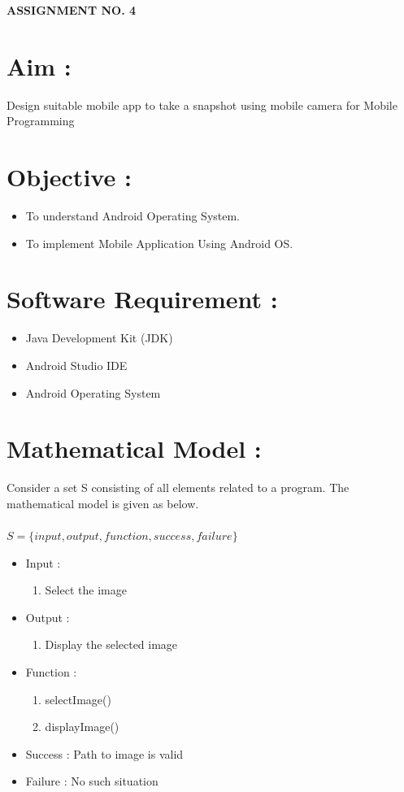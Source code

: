 \documentclass{article}
\begin{document}
\begin{center}
\textbf{\bfseries\Large ASSIGNMENT NO. 4}
\\[1cm]
\end{center}


\section{Aim : } 
	Design suitable mobile app to take a snapshot using mobile camera for Mobile Programming


\section{Objective : }  
	\begin{itemize}
		\item To understand Android Operating System.
		\item To implement Mobile Application Using Android OS.
	\end{itemize}

\section{Software Requirement : }  
	\begin{itemize}
    	\item Java Development Kit (JDK)
		\item Android Studio IDE
		\item Android Operating System
	\end{itemize}

\section{Mathematical Model : }  
	Consider a set S consisting of all elements related to a program. 
	The mathematical model is given as below.  \\  \\
    $S=\{input,output,function,success,failure\}$
	\begin{itemize}
		\item Input  :
			\begin{enumerate}
				\item Select the image
			\end{enumerate}
		\item Output :
        	\begin{enumerate}
				\item Display the selected image
			\end{enumerate}
		\item Function :
			\begin{enumerate}
				\item selectImage()
   				\item displayImage()
			\end{enumerate}
		\item Success : Path to image is valid
        \item Failure : No such situation
	\end{itemize}  
\end{document}
